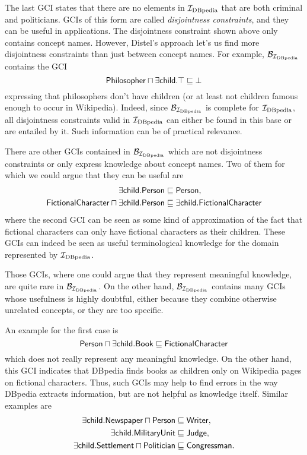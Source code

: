 The last GCI states that there are no elements in ${\mathcal{I}_{\text{DBpedia}}}$ that are both criminal and
politicians.  GCIs of this form are called \emph{disjointness constraints}, and they can
be useful in applications.  The disjointness constraint
shown above only contains concept names.  However, Distel's approach let's us find more
disjointness constraints than just between concept names.  For example,
$\mathcal{B}_{{\mathcal{I}_{\text{DBpedia}}}}$ contains the GCI
\begin{equation*}
   \sf Philosopher \sqcap \exists child. \top \sqsubseteq \bot
\end{equation*}
expressing that philosophers don't have children (or at least not children famous enough
to occur in Wikipedia).  Indeed, since $\mathcal{B}_{{\mathcal{I}_{\text{DBpedia}}}}$ is complete for
${\mathcal{I}_{\text{DBpedia}}}$, all disjointness constraints valid in ${\mathcal{I}_{\text{DBpedia}}}$ can either be found in this
base or are entailed by it.  Such information can be of practical relevance.

There are other GCIs contained in $\mathcal{B}_{\mathcal{I}_{\text{DBpedia}}}$ which are not disjointness
constraints or only express knowledge about concept names.  Two of them for which we could
argue that they can be useful are
\begin{align*}
  \sf \exists child. Person &\sqsubseteq \sf Person, \\
  \sf FictionalCharacter \sqcap \exists child. Person &\sqsubseteq \sf \exists child. FictionalCharacter
\end{align*}
where the second GCI can be seen as some kind of \ELbot approximation of the fact that
fictional characters can only have fictional characters as their children.  These GCIs can
indeed be seen as useful terminological knowledge for the domain represented by
${\mathcal{I}_{\text{DBpedia}}}$.

Those GCIs, \ie where one could argue that they represent meaningful knowledge, are quite
rare in $\mathcal{B}_{\mathcal{I}_{\text{DBpedia}}}$.  On the other hand, $\mathcal{B}_{\mathcal{I}_{\text{DBpedia}}}$ contains many
GCIs whose usefulness is highly doubtful, either because they combine otherwise unrelated
concepts, or they are too specific.

An example for the first case is
\begin{equation*}
  \sf Person \sqcap \exists child. Book \sqsubseteq FictionalCharacter
\end{equation*}
which does not really represent any meaningful knowledge.  On the other hand, this GCI
indicates that DBpedia finds books as children only on Wikipedia pages on fictional
characters.  Thus, such GCIs may help to find errors in the way DBpedia extracts
information, but are not helpful as knowledge itself.  Similar examples are
\begin{align*}
  \sf \exists child. Newspaper \sqcap Person &\sqsubseteq \sf Writer, \\
  \sf \exists child. MilitaryUnit &\sqsubseteq \sf Judge, \\
  \sf \exists child. Settlement \sqcap Politician &\sqsubseteq \sf Congressman.
\end{align*}

